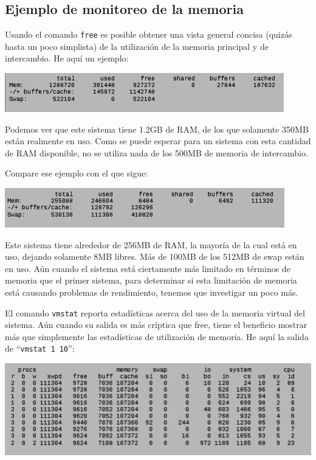 \documentclass[12pt]{article}
\begin{document}
\subsection*{Ejemplo de monitoreo de la memoria}

Usando el comando \texttt{free} es posible obtener una vista general 
concisa (quizás hasta un poco simplista) de la utilización de la memoria
principal y de intercambio. He aquí un ejemplo:

\begin{center}
 \includegraphics{free1.png}
\end{center}

Podemos ver que este sistema tiene 1.2GB de RAM, de los que solamente 
350MB están realmente en uso. Como se puede esperar para un sistema con 
esta cantidad de RAM disponible, no se utiliza nada de los 500MB de 
memoria de intercambio.

Compare ese ejemplo con el que sigue:

\begin{center}
 \includegraphics{free2.png}
\end{center}

      
Este sistema tiene alrededor de 256MB de RAM, la mayoría de la cual está 
en uso, dejando solamente 8MB libres. Más de 100MB de los 512MB de swap 
están en uso. Aún cuando el sistema está ciertamente más limitado en 
términos de memoria que el primer sistema, para determinar si esta 
limitación de memoria está causando problemas de rendimiento, tenemos 
que investigar un poco más.

El comando \texttt{vmstat} reporta estadísticas acerca del uso de la memoria
virtual del sistema. Aún cuando su salida es más críptica que free, tiene 
el beneficio mostrar más que simplemente las estadísticas de utilización de
memoria. He aquí la salida de ``\texttt{vmstat 1 10}'':

\begin{center}
 \includegraphics{vmstat2.png}
\end{center}
\end{document}
